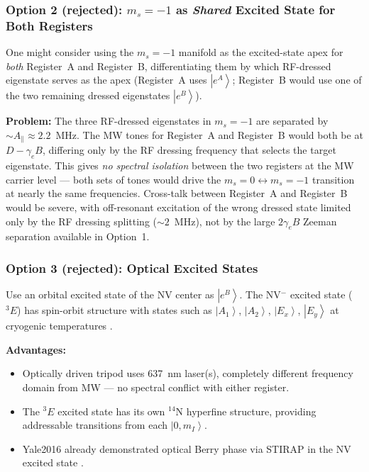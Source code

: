 \documentclass[11pt,letterpaper]{article}
\newcommand{\ket}[1]{\left|#1\right\rangle}
\begin{document}
\subsubsection{Option 2 (rejected): $m_s = -1$ as \emph{Shared} Excited State for Both Registers}

One might consider using the $m_s = -1$ manifold as the excited-state apex for \emph{both} Register~A and Register~B, differentiating them by which RF-dressed eigenstate serves as the apex (Register~A uses $\ket{e^A}$; Register~B would use one of the two remaining dressed eigenstates $\ket{e^B}$).

\medskip
\noindent\textbf{Problem:} The three RF-dressed eigenstates in $m_s = -1$ are separated by $\sim A_\parallel \approx 2.2$~MHz. The MW tones for Register~A and Register~B would both be at $D - \gamma_e B$, differing only by the RF dressing frequency that selects the target eigenstate. This gives \emph{no spectral isolation} between the two registers at the MW carrier level --- both sets of tones would drive the $m_s = 0 \leftrightarrow m_s = -1$ transition at nearly the same frequencies. Cross-talk between Register~A and Register~B would be severe, with off-resonant excitation of the wrong dressed state limited only by the RF dressing splitting ($\sim 2$~MHz), not by the large $2\gamma_e B$ Zeeman separation available in Option~1.

\medskip
\noindent{}

\subsubsection{Option 3 (rejected): Optical Excited States}

Use an orbital excited state of the NV center as $\ket{e^B}$. The NV$^-$ excited state ($^3E$) has spin-orbit structure with states such as $\ket{A_1}$, $\ket{A_2}$, $\ket{E_x}$, $\ket{E_y}$ at cryogenic temperatures \cite{Doherty2013}.

\medskip
\noindent\textbf{Advantages:}
\begin{itemize}[leftmargin=*]
    \item Optically driven tripod uses 637~nm laser(s), completely different frequency domain from MW --- no spectral conflict with either register.
    \item The $^3E$ excited state has its own $^{14}$N hyperfine structure, providing addressable transitions from each $\ket{0, m_I}$.
    \item Yale2016 already demonstrated optical Berry phase via STIRAP in the NV excited state \cite{Yale2016}.
\end{itemize}
\end{document}
